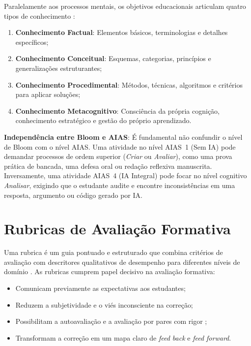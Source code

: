 Paralelamente aos processos mentais, os objetivos educacionais articulam quatro tipos de conhecimento \cite{anderson2001taxonomy}:
\begin{enumerate}
  \item \textbf{Conhecimento Factual}: Elementos b{\'a}sicos, terminologias e detalhes espec{\'i}ficos;
  \item \textbf{Conhecimento Conceitual}: Esquemas, categorias, princ{\'i}pios e generaliza{\c c}{\~o}es estruturantes;
  \item \textbf{Conhecimento Procedimental}: M{\'e}todos, t{\'e}cnicas, algoritmos e crit{\'e}rios para aplicar solu{\c c}{\~o}es;
  \item \textbf{Conhecimento Metacognitivo}: Consci{\^e}ncia da pr{\'o}pria cogni{\c c}{\~a}o, conhecimento estrat{\'e}gico e gest{\~a}o do pr{\'o}prio aprendizado.
\end{enumerate}

\begin{conceitochave}
\textbf{Independ{\^e}ncia entre Bloom e AIAS}: {\'E} fundamental n{\~a}o confundir o n{\'i}vel de Bloom com o n{\'i}vel AIAS. Uma atividade no n{\'i}vel AIAS~1 (Sem IA) pode demandar processos de ordem superior (\emph{Criar} ou \emph{Avaliar}), como uma prova pr{\'a}tica de bancada, uma defesa oral ou reda{\c c}{\~a}o reflexiva manuscrita. Inversamente, uma atividade AIAS~4 (IA Integral) pode focar no n{\'i}vel cognitivo \emph{Analisar}, exigindo que o estudante audite e encontre inconsist{\^e}ncias em uma resposta, argumento ou c{\'o}digo gerado por IA.
\end{conceitochave}

\section{Rubricas de Avalia{\c c}{\~a}o Formativa}

Uma rubrica {\'e} um guia pontuado e estruturado que combina crit{\'e}rios de avalia{\c c}{\~a}o com descritores qualitativos de desempenho para diferentes n{\'i}veis de dom{\'i}nio \cite{brookhart2013rubrics}. As rubricas cumprem papel decisivo na avalia{\c c}{\~a}o formativa:
\begin{itemize}
  \item Comunicam previamente as expectativas aos estudantes;
  \item Reduzem a subjetividade e o vi{\'e}s inconsciente na corre{\c c}{\~a}o;
  \item Possibilitam a autoavalia{\c c}{\~a}o e a avalia{\c c}{\~a}o por pares com rigor \cite{andrade2019critical};
  \item Transformam a corre{\c c}{\~a}o em um mapa claro de \emph{feed back} e \emph{feed forward}.
\end{itemize}

